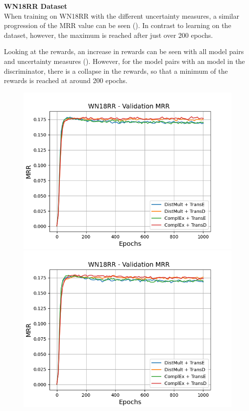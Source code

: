 \textbf{WN18RR Dataset}
\label{subsubsec:metrics_wn18rr} \\
%
When training \usgan on \textsc{WN18RR} with the different uncertainty measures, a similar progression of the MRR value can be seen ().
In contrast to learning on the \umls dataset, however, the maximum is reached after just over 200 epochs.

Looking at the rewards, an increase in rewards can be seen with all model pairs and uncertainty measures ().
However, for the model pairs with an \transd model in the discriminator, there is a collapse in the rewards, so that a minimum of the rewards is reached at around 200 epochs.
\clearpage
\begin{figure}[H]
    \centering
    \begin{minipage}{.45\textwidth}
      \centering
      \includegraphics[width=0.9\linewidth]{figures/results/gan_train/not_pretrained/uncertainty/max_distribution/entropy/wn18rr/1k_epochs/uncertainty_wn18rr_mrrs.png}
    \end{minipage}%
    \begin{minipage}{.45\textwidth}
      \centering
      \includegraphics[width=0.9\linewidth]{figures/results/gan_train/not_pretrained/uncertainty/max_distribution/least_confidence/wn18rr/uncertainty_wn18rr_mrrs.png}

\end{minipage}
\end{figure}
